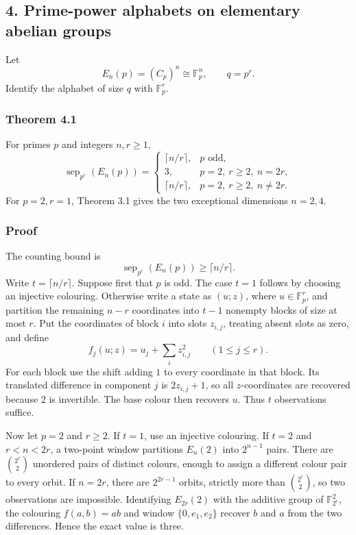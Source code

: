 \documentclass[
]{article}
\begin{document}
\subsection{4. Prime-power alphabets on elementary abelian groups}
Let
\[
E_n(p)=(C_p)^n\cong\mathbb F_p^n,\qquad q=p^r.
\]
Identify the alphabet of size \(q\) with \(\mathbb F_p^r\).

\subsubsection{Theorem 4.1}
For primes \(p\) and integers \(n,r\ge1\),
\[
\operatorname{sep}_{p^r}(E_n(p))=
\begin{cases}
\lceil n/r\rceil,&p\text{ odd},\\
3,&p=2,\ r\ge2,\ n=2r,\\
\lceil n/r\rceil,&p=2,\ r\ge2,\ n\ne2r.
\end{cases}
\]
For \(p=2,r=1\), Theorem 3.1 gives the two exceptional dimensions \(n=2,4\).

\subsubsection{Proof}
The counting bound is
\[
\operatorname{sep}_{p^r}(E_n(p))\ge\lceil n/r\rceil.
\]
Write \(t=\lceil n/r\rceil\). Suppose first that \(p\) is odd. The case
\(t=1\) follows by choosing an injective colouring. Otherwise write a state as
\((u;z)\), where \(u\in\mathbb F_p^r\), and partition the remaining \(n-r\)
coordinates into \(t-1\) nonempty blocks of size at most \(r\). Put the
coordinates of block \(i\) into slots \(z_{i,j}\), treating absent slots as
zero, and define
\[
f_j(u;z)=u_j+\sum_i z_{i,j}^2\qquad(1\le j\le r).
\]
For each block use the shift adding \(1\) to every coordinate in that block.
Its translated difference in component \(j\) is \(2z_{i,j}+1\), so all
\(z\)-coordinates are recovered because \(2\) is invertible. The base colour
then recovers \(u\). Thus \(t\) observations suffice.

Now let \(p=2\) and \(r\ge2\). If \(t=1\), use an injective colouring. If
\(t=2\) and \(r<n<2r\), a two-point window partitions \(E_n(2)\) into
\(2^{n-1}\) pairs. There are \(\binom{2^r}{2}\) unordered pairs of distinct
colours, enough to assign a different colour pair to every orbit. If \(n=2r\),
there are \(2^{2r-1}\) orbits, strictly more than
\(\binom{2^r}{2}\), so two observations are impossible. Identifying
\(E_{2r}(2)\) with the additive group of \(\mathbb F_{2^r}^2\), the colouring
\(f(a,b)=ab\) and window \(\{0,e_1,e_2\}\) recover \(b\) and \(a\) from the
two differences. Hence the exact value is three.
\end{document}
